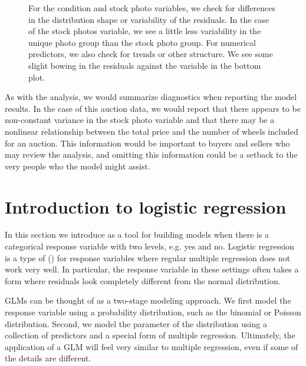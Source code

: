 \begin{description}
\begin{figure}
  \centering
  \caption{For the condition and stock photo variables, we check
      for differences in the distribution shape or variability of
      the residuals.
      In the case of the stock photos variable, we see a little
      less variability in the unique photo group than the stock
      photo group.
      For numerical predictors, we also check for trends or other
      structure.
      We see some slight bowing in the residuals against the
       variable in the bottom plot.}
  \label{mkDiagnosticEvsVariables}
\end{figure}

\end{description}

As with the  analysis, we would summarize
diagnostics when reporting the model results.
In the case of this auction data,
we would report that there appears to be non-constant variance
in the stock photo variable and that there may be a nonlinear
relationship between the total price and the number of wheels
included for an auction.
This information would be important to buyers and sellers who
may review the analysis, and omitting this information could be
a setback to the very people who the model might assist.





\section{Introduction to logistic regression}
\label{logisticRegression}


\noindent%
In this section we introduce 
as a tool for building models when there is a categorical
response variable with two levels, e.g. yes and no.
Logistic regression is a type of
 ()
for response variables
where regular multiple regression does not work very well.
In particular, the response variable in these settings often
takes a form where residuals look completely different from
the normal distribution.

GLMs can be thought of as a two-stage modeling approach.
We first model the response variable using a probability
distribution, such as the binomial or Poisson distribution.
Second, we model the parameter of the distribution using
a collection of predictors and a special form of multiple
regression.
Ultimately, the application of a GLM will feel very similar
to multiple regression, even if some of the details are
different.

